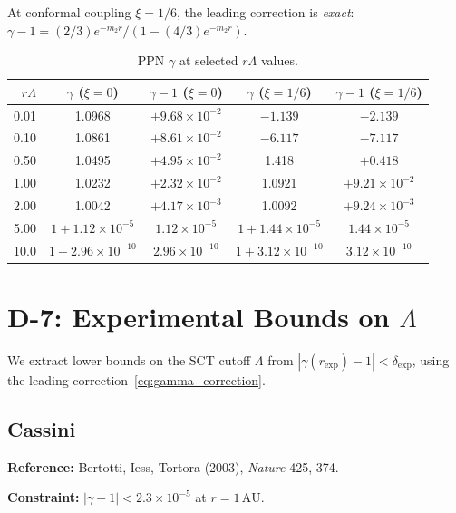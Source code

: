 \documentclass[11pt,a4paper]{article}
\begin{document}
At conformal coupling $\xi = 1/6$, the leading correction is
\emph{exact}: $\gamma - 1 = (2/3)e^{-m_2 r}/(1 - (4/3)e^{-m_2 r})$.

\begin{table}[h]
\centering
\caption{PPN $\gamma$ at selected $r\Lambda$ values.}
\label{tab:gamma}
\begin{tabular}{r c c c c}
\toprule
$r\Lambda$ & $\gamma$ ($\xi{=}0$) & $\gamma - 1$ ($\xi{=}0$)
  & $\gamma$ ($\xi{=}1/6$) & $\gamma - 1$ ($\xi{=}1/6$) \\
\midrule
0.01  &  1.0968  &   $+9.68 \times 10^{-2}$
  & $-1.139$ & $-2.139$ \\
0.10  &  1.0861  &   $+8.61 \times 10^{-2}$
  & $-6.117$ & $-7.117$ \\
0.50  &  1.0495  &   $+4.95 \times 10^{-2}$
  & 1.418   &  $+0.418$ \\
1.00  &  1.0232  &   $+2.32 \times 10^{-2}$
  & 1.0921  &  $+9.21 \times 10^{-2}$ \\
2.00  &  1.0042  &   $+4.17 \times 10^{-3}$
  & 1.0092  &  $+9.24 \times 10^{-3}$ \\
5.00  &  $1 + 1.12 \times 10^{-5}$  & $1.12 \times 10^{-5}$
  & $1 + 1.44 \times 10^{-5}$  & $1.44 \times 10^{-5}$ \\
10.0  &  $1 + 2.96 \times 10^{-10}$ & $2.96 \times 10^{-10}$
  & $1 + 3.12 \times 10^{-10}$ & $3.12 \times 10^{-10}$ \\
\bottomrule
\end{tabular}
\end{table}


\section{D-7: Experimental Bounds on $\Lambda$}
\label{sec:bounds}

We extract lower bounds on the SCT cutoff $\Lambda$ from
$|\gamma(r_\mathrm{exp}) - 1| < \delta_\mathrm{exp}$, using the leading
correction~\eqref{eq:gamma_correction}.

\subsection{Cassini}

\textbf{Reference:} Bertotti, Iess, Tortora (2003), \textit{Nature} 425, 374.

\textbf{Constraint:} $|\gamma - 1| < 2.3 \times 10^{-5}$ at $r = 1\,\mathrm{AU}$.
\end{document}
